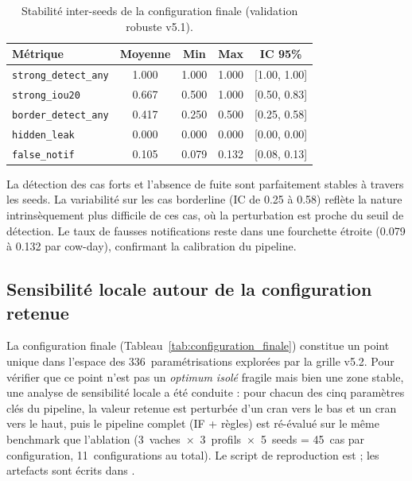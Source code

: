 \begin{table}[H]
    \centering
    \caption{Stabilité inter-seeds de la configuration finale (validation robuste v5.1).}
    \label{tab:stabilite_seeds}
    \begin{tabular}{lcccc}
        \toprule
        \textbf{Métrique} & \textbf{Moyenne} & \textbf{Min} & \textbf{Max}
        & \textbf{IC 95\%} \\
        \midrule
        \texttt{strong\_detect\_any}   & 1.000 & 1.000 & 1.000 & [1.00, 1.00] \\
        \texttt{strong\_iou20}         & 0.667 & 0.500 & 1.000 & [0.50, 0.83] \\
        \texttt{border\_detect\_any}   & 0.417 & 0.250 & 0.500 & [0.25, 0.58] \\
        \texttt{hidden\_leak}          & 0.000 & 0.000 & 0.000 & [0.00, 0.00] \\
        \texttt{false\_notif}          & 0.105 & 0.079 & 0.132 & [0.08, 0.13] \\
        \bottomrule
    \end{tabular}
\end{table}

La détection des cas forts et l'absence de fuite sont parfaitement stables à travers
les seeds. La variabilité sur les cas borderline (IC de 0.25 à 0.58) reflète la nature
intrinsèquement plus difficile de ces cas, où la perturbation est proche du seuil de
détection. Le taux de fausses notifications reste dans une fourchette étroite
(0.079 à 0.132 par cow-day), confirmant la calibration du pipeline.

\FloatBarrier
\subsection{Sensibilité locale autour de la configuration retenue}
\label{subsec:sensibilite_locale}

La configuration finale (Tableau~\ref{tab:configuration_finale}) constitue un point unique
dans l'espace des 336~paramétrisations explorées par la grille v5.2. Pour vérifier que ce
point n'est pas un \emph{optimum isolé} fragile mais bien une zone stable, une analyse de
sensibilité locale a été conduite : pour chacun des cinq paramètres clés du pipeline, la
valeur retenue est perturbée d'un cran vers le bas et un cran vers le haut, puis le
pipeline complet (IF + règles) est ré-évalué sur le même benchmark que l'ablation
(3~vaches~$\times$~3~profils~$\times$~5~seeds = 45~cas par configuration, 11~configurations
au total). Le script de reproduction est
; les artefacts sont écrits dans
.

